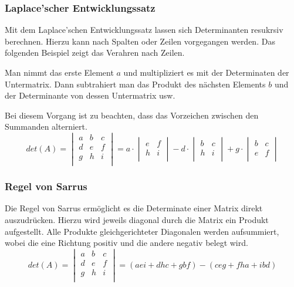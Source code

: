 \subsubsection{Laplace'scher Entwicklungssatz}
Mit dem Laplace'schen Entwicklungssatz lassen sich Determinanten
resukrsiv berechnen. Hierzu kann nach Spalten oder Zeilen vorgegangen
werden. Das folgenden Beispiel zeigt das Verahren nach Zeilen. 

Man nimmt das erste Element $a$ und multipliziert es mit der Determinaten
der Untermatrix. Dann subtrahiert man das Produkt des nächsten Elements 
$b$ und der Determinante von dessen Untermatrix usw. 

Bei diesem Vorgang ist zu beachten, dass das Vorzeichen zwischen den
Summanden alterniert. 
\[  
    det(A)
        =   \begin{vmatrix}
                a & b & c \\
                d & e & f \\
                g & h & i \\
            \end{vmatrix}
        = a \cdot 
            \begin{vmatrix} 
                e & f \\
                h & i \\
            \end{vmatrix}
            - 
            d \cdot 
            \begin{vmatrix}
                b & c \\
                h & i \\
            \end{vmatrix}
            + 
            g \cdot 
            \begin{vmatrix}
                b & c \\
                e & f \\
            \end{vmatrix} 
\]

\subsubsection{Regel von Sarrus}
Die Regel von Sarrus ermöglicht es die Determinate einer Matrix direkt
auszudrücken. Hierzu wird jeweils diagonal durch die Matrix ein Produkt
aufgestellt. Alle Produkte gleichgerichteter Diagonalen werden 
aufsummiert, wobei die eine Richtung positiv und die andere negativ
belegt wird.
\[  
    det(A)
        =   \begin{vmatrix}
                a & b & c \\
                d & e & f \\
                g & h & i \\
            \end{vmatrix}
        = (aei + dhc + gbf) - (ceg + fha + ibd)
\]


